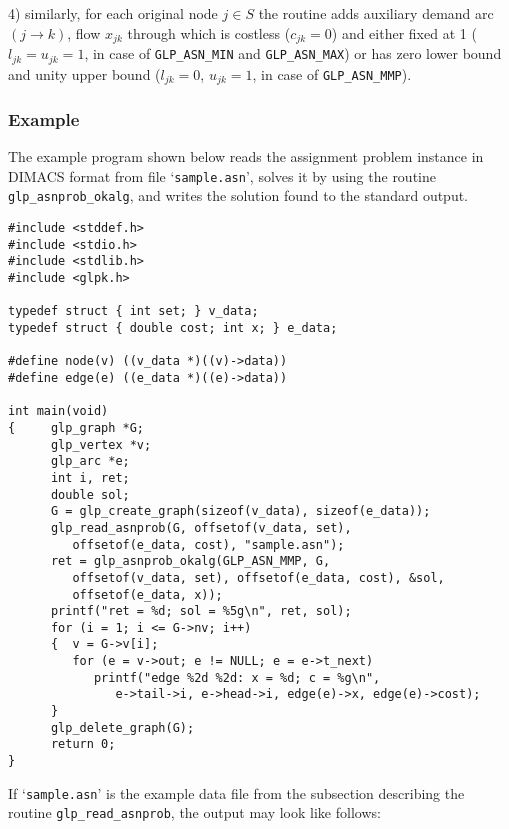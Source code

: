 \documentclass[dvipdfm,11pt]{report}
\begin{document}
4) similarly, for each original node $j\in S$ the routine adds
auxiliary demand arc $(j\rightarrow k)$, flow $x_{jk}$ through which is
costless ($c_{jk}=0$) and either fixed at 1 ($l_{jk}=u_{jk}=1$, in case
of \verb|GLP_ASN_MIN| and \verb|GLP_ASN_MAX|) or has zero lower bound
and unity upper bound ($l_{jk}=0$, $u_{jk}=1$, in case of
\verb|GLP_ASN_MMP|).

\subsubsection*{Example}

The example program shown below reads the assignment problem instance
in DIMACS format from file `\verb|sample.asn|', solves it by using the
routine \verb|glp_asnprob_okalg|, and writes the solution found to the
standard output.

\begin{footnotesize}
\begin{verbatim}
#include <stddef.h>
#include <stdio.h>
#include <stdlib.h>
#include <glpk.h>

typedef struct { int set; } v_data;
typedef struct { double cost; int x; } e_data;

#define node(v) ((v_data *)((v)->data))
#define edge(e) ((e_data *)((e)->data))

int main(void)
{     glp_graph *G;
      glp_vertex *v;
      glp_arc *e;
      int i, ret;
      double sol;
      G = glp_create_graph(sizeof(v_data), sizeof(e_data));
      glp_read_asnprob(G, offsetof(v_data, set),
         offsetof(e_data, cost), "sample.asn");
      ret = glp_asnprob_okalg(GLP_ASN_MMP, G,
         offsetof(v_data, set), offsetof(e_data, cost), &sol,
         offsetof(e_data, x));
      printf("ret = %d; sol = %5g\n", ret, sol);
      for (i = 1; i <= G->nv; i++)
      {  v = G->v[i];
         for (e = v->out; e != NULL; e = e->t_next)
            printf("edge %2d %2d: x = %d; c = %g\n",
               e->tail->i, e->head->i, edge(e)->x, edge(e)->cost);
      }
      glp_delete_graph(G);
      return 0;
}
\end{verbatim}
\end{footnotesize}

If `\verb|sample.asn|' is the example data file from the subsection
describing the routine \verb|glp_read_asnprob|, the output may look
like follows:
\end{document}
